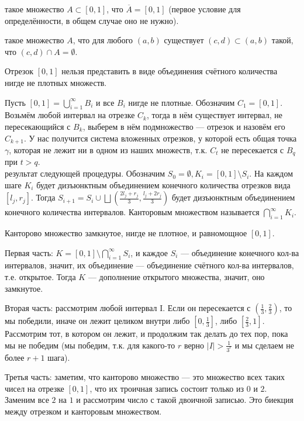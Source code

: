 \documentclass[12pt,a4paper]{article}
\begin{document}
 такое множество $A\subset[0,1]$, что $\overline{A}=[0,1]$ (первое условие для определённости, в общем случае оно не нужно).

 такое множество $A$, что для любого $(a,b)$ существует $(c,d)\subset (a,b)$ такой, что $(c,d)\cap A=\emptyset$.

 Отрезок $[0,1]$ нельзя представить в виде объединения счётного количества нигде не плотных множеств.

\proof Пусть $[0,1]=\bigcup_{i=1}^\infty B_i$ и все $B_i$ нигде не плотные. Обозначим $C_1=[0,1]$. Возьмём любой интервал на отрезке $C_k$, тогда в нём существует интервал, не пересекающийся с $B_k$, выберем в нём подмножество --- отрезок и назовём его $C_{k+1}$. У нас получится система вложенных отрезков, у которой есть общая точка $\gamma$, которая не лежит ни в одном из наших множеств, т.к. $C_t$ не пересекается с $B_q$ при $t>q$. \QEDA\\

 результат следующей процедуры. Обозначим $S_0=\emptyset,K_i=[0,1]\setminus S_i$. На каждом шаге $K_i$ будет дизъюнктным объединением конечного количества отрезков вида $[l_j,r_j]$. Тогда $S_{i+1}=S_i\cup\bigsqcup (\frac{2l_j+r_j}{3},\frac{l_j+2r_j}{3})$ будет дизъюнктным объединением конечного количества интервалов. Канторовым множеством называется $\bigcap_{i=1}^\infty K_i$.

\theorem Канторово множество замкнутое, нигде не плотное, и равномощное $[0,1]$.

\proof Первая часть: $K=[0,1]\setminus\bigcap_{i=1}^\infty S_i$, и каждое $S_i$ --- объединение конечного кол-ва интервалов, значит, их объединение --- объединение счётного кол-ва интервалов, т.е. открытое. Тогда $K$ --- дополнение открытого множества, значит, оно замкнутое.

Вторая часть: рассмотрим любой интервал I. Если он пересекается с $(\frac{1}{3},\frac{2}{3})$, то мы победили, иначе он лежит целиком внутри либо $[0,\frac{1}{3}]$, либо $[\frac{2}{3},1]$. Рассмотрим тот, в котором он лежит, и продолжим так делать до тех пор, пока мы не победим (мы победим, т.к. для какого-то $r$ верно $|I|>\frac{1}{3^r}$ и мы сделаем не более $r+1$ шага).

Третья часть: заметим, что канторово множество --- это множество всех таких чисел на отрезке $[0,1]$, что их троичная запись состоит только из $0$ и $2$. Заменим все $2$ на $1$ и рассмотрим число с такой двоичной записью. Это биекция между отрезком и канторовым множеством.\QEDA\\
\end{document}
